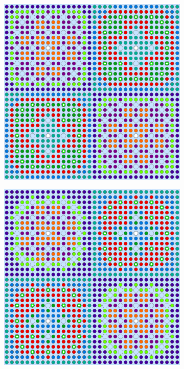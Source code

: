 \begin{appendices}
\begin{figure}[h!]
\begin{subfigure}{0.48\textwidth}
  \caption{}
  \label{fig:2x2-combined-pca-2}
\end{subfigure}
\begin{subfigure}{0.48\textwidth}
  \centering
  \includegraphics[width=0.95\linewidth]{figures/unsupervised/geometries/dimension-reduce/2x2/ica}
  \caption{}
  \label{fig:2x2-combined-ica-2}
\end{subfigure}%
\begin{subfigure}{0.48\textwidth}
  \centering
  \includegraphics[width=0.95\linewidth]{figures/unsupervised/geometries/dimension-reduce/2x2/factor-analysis}

\end{subfigure}
\end{figure}
\end{appendices}

